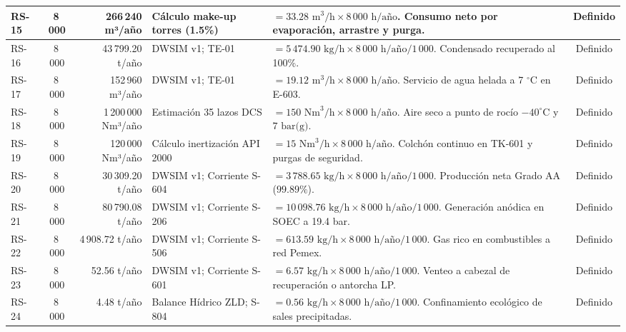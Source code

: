 \documentclass[10pt,letterpaper]{article}
\begin{document}
\begin{landscape}
\begin{xltabular}{\linewidth}{|l|c|r|p{3.5cm}|>{\raggedright\arraybackslash}X|c|}
RS-15 & 8\,000 & 266\,240 m³/año & Cálculo make-up torres (1.5\%) & $= 33.28\text{ m}^3\text{/h} \times 8\,000\text{ h/año}$. Consumo neto por evaporación, arrastre y purga. & Definido \\ \hline
RS-16 & 8\,000 & 43\,799.20 t/año & DWSIM v1; TE-01 & $= 5\,474.90\text{ kg/h} \times 8\,000\text{ h/año} / 1\,000$. Condensado recuperado al 100\%. & Definido \\ \hline
RS-17 & 8\,000 & 152\,960 m³/año & DWSIM v1; TE-01 & $= 19.12\text{ m}^3\text{/h} \times 8\,000\text{ h/año}$. Servicio de agua helada a 7 $^\circ$C en E-603. & Definido \\ \hline
RS-18 & 8\,000 & 1\,200\,000 Nm³/año & Estimación 35 lazos DCS & $= 150\text{ Nm}^3\text{/h} \times 8\,000\text{ h/año}$. Aire seco a punto de rocío $-40^\circ\text{C}$ y $7\text{ bar(g)}$. & Definido \\ \hline
RS-19 & 8\,000 & 120\,000 Nm³/año & Cálculo inertización API 2000 & $= 15\text{ Nm}^3\text{/h} \times 8\,000\text{ h/año}$. Colchón continuo en TK-601 y purgas de seguridad. & Definido \\ \hline
RS-20 & 8\,000 & 30\,309.20 t/año & DWSIM v1; Corriente S-604 & $= 3\,788.65\text{ kg/h} \times 8\,000\text{ h/año} / 1\,000$. Producción neta Grado AA ($99.89\%$). & Definido \\ \hline
RS-21 & 8\,000 & 80\,790.08 t/año & DWSIM v1; Corriente S-206 & $= 10\,098.76\text{ kg/h} \times 8\,000\text{ h/año} / 1\,000$. Generación anódica en SOEC a 19.4 bar. & Definido \\ \hline
RS-22 & 8\,000 & 4\,908.72 t/año & DWSIM v1; Corriente S-506 & $= 613.59\text{ kg/h} \times 8\,000\text{ h/año} / 1\,000$. Gas rico en combustibles a red Pemex. & Definido \\ \hline
RS-23 & 8\,000 & 52.56 t/año & DWSIM v1; Corriente S-601 & $= 6.57\text{ kg/h} \times 8\,000\text{ h/año} / 1\,000$. Venteo a cabezal de recuperación o antorcha LP. & Definido \\ \hline
RS-24 & 8\,000 & 4.48 t/año & Balance Hídrico ZLD; S-804 & $= 0.56\text{ kg/h} \times 8\,000\text{ h/año} / 1\,000$. Confinamiento ecológico de sales precipitadas. & Definido \\ \hline
\end{xltabular}
\end{landscape}

\newpage
\end{document}
